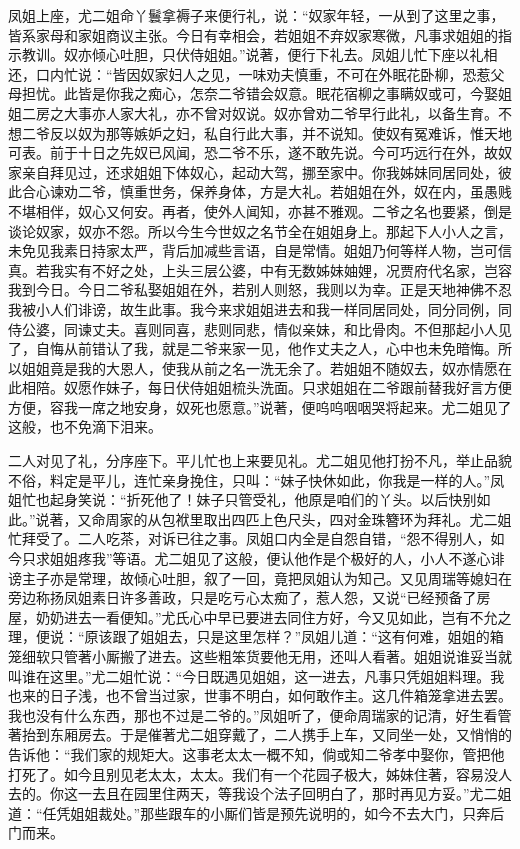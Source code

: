 \begin{parag}
    凤姐上座，尤二姐命丫鬟拿褥子来便行礼，说：“奴家年轻，一从到了这里之事，皆系家母和家姐商议主张。今日有幸相会，若姐姐不弃奴家寒微，凡事求姐姐的指示教训。奴亦倾心吐胆，只伏侍姐姐。”说著，便行下礼去。凤姐儿忙下座以礼相还，口内忙说：“皆因奴家妇人之见，一味劝夫慎重，不可在外眠花卧柳，恐惹父母担忧。此皆是你我之痴心，怎奈二爷错会奴意。眠花宿柳之事瞒奴或可，今娶姐姐二房之大事亦人家大礼，亦不曾对奴说。奴亦曾劝二爷早行此礼，以备生育。不想二爷反以奴为那等嫉妒之妇，私自行此大事，并不说知。使奴有冤难诉，惟天地可表。前于十日之先奴已风闻，恐二爷不乐，遂不敢先说。今可巧远行在外，故奴家亲自拜见过，还求姐姐下体奴心，起动大驾，挪至家中。你我姊妹同居同处，彼此合心谏劝二爷，慎重世务，保养身体，方是大礼。若姐姐在外，奴在内，虽愚贱不堪相伴，奴心又何安。再者，使外人闻知，亦甚不雅观。二爷之名也要紧，倒是谈论奴家，奴亦不怨。所以今生今世奴之名节全在姐姐身上。那起下人小人之言，未免见我素日持家太严，背后加减些言语，自是常情。姐姐乃何等样人物，岂可信真。若我实有不好之处，上头三层公婆，中有无数姊妹妯娌，况贾府代名家，岂容我到今日。今日二爷私娶姐姐在外，若别人则怒，我则以为幸。正是天地神佛不忍我被小人们诽谤，故生此事。我今来求姐姐进去和我一样同居同处，同分同例，同侍公婆，同谏丈夫。喜则同喜，悲则同悲，情似亲妹，和比骨肉。不但那起小人见了，自悔从前错认了我，就是二爷来家一见，他作丈夫之人，心中也未免暗悔。所以姐姐竟是我的大恩人，使我从前之名一洗无余了。若姐姐不随奴去，奴亦情愿在此相陪。奴愿作妹子，每日伏侍姐姐梳头洗面。只求姐姐在二爷跟前替我好言方便方便，容我一席之地安身，奴死也愿意。”说著，便呜呜咽咽哭将起来。尤二姐见了这般，也不免滴下泪来。
\end{parag}


\begin{parag}
    二人对见了礼，分序座下。平儿忙也上来要见礼。尤二姐见他打扮不凡，举止品貌不俗，料定是平儿，连忙亲身挽住，只叫：“妹子快休如此，你我是一样的人。”凤姐忙也起身笑说：“折死他了！妹子只管受礼，他原是咱们的丫头。以后快别如此。”说著，又命周家的从包袱里取出四匹上色尺头，四对金珠簪环为拜礼。尤二姐忙拜受了。二人吃茶，对诉已往之事。凤姐口内全是自怨自错，“怨不得别人，如今只求姐姐疼我”等语。尤二姐见了这般，便认他作是个极好的人，小人不遂心诽谤主子亦是常理，故倾心吐胆，叙了一回，竟把凤姐认为知己。又见周瑞等媳妇在旁边称扬凤姐素日许多善政，只是吃亏心太痴了，惹人怨，又说“已经预备了房屋，奶奶进去一看便知。”尤氏心中早已要进去同住方好，今又见如此，岂有不允之理，便说：“原该跟了姐姐去，只是这里怎样？”凤姐儿道：“这有何难，姐姐的箱笼细软只管著小厮搬了进去。这些粗笨货要他无用，还叫人看著。姐姐说谁妥当就叫谁在这里。”尤二姐忙说：“今日既遇见姐姐，这一进去，凡事只凭姐姐料理。我也来的日子浅，也不曾当过家，世事不明白，如何敢作主。这几件箱笼拿进去罢。我也没有什么东西，那也不过是二爷的。”凤姐听了，便命周瑞家的记清，好生看管著抬到东厢房去。于是催著尤二姐穿戴了，二人携手上车，又同坐一处，又悄悄的告诉他：“我们家的规矩大。这事老太太一概不知，倘或知二爷孝中娶你，管把他打死了。如今且别见老太太，太太。我们有一个花园子极大，姊妹住著，容易没人去的。你这一去且在园里住两天，等我设个法子回明白了，那时再见方妥。”尤二姐道：“任凭姐姐裁处。”那些跟车的小厮们皆是预先说明的，如今不去大门，只奔后门而来。
\end{parag}


